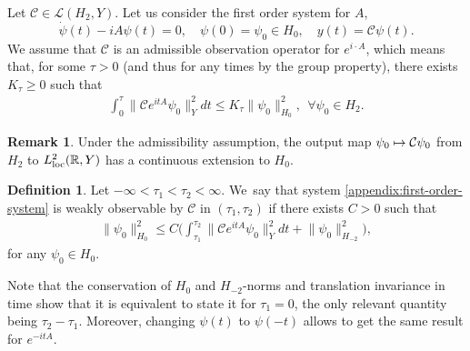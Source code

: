 \documentclass[10pt]{amsart}
\newcommand\mto{\mathchoice{\longmapsto}{\mapsto}{\mapsto}{\mapsto}}
\theoremstyle{definition}
\newtheorem{definition}[theorem]{Definition}
\newtheorem{remark}[theorem]{Remark}
\let\mc\mathcal
\newcommand{\R}{\mathbb{R}}
\providecommand{\norm}[1]{\lVert#1\rVert}
\begin{document}
Let $\mc{C}\in \mc{L}(H_2, Y)$. Let us consider the first order system for $A$,
\begin{equation}
\label{appendix:first-order-system}
\dot{\psi}(t)-iA\psi(t)=0,\quad \psi(0)=\psi_0\in H_0,\quad y(t)=\mc{C}\psi(t).
\end{equation}
We assume that $\mc{C}$ is an admissible observation operator for $e^{i\cdot A}$, which means that, for some $\tau>0$ (and thus for any times by the group property), there exists $K_\tau\geq 0$ such that
\begin{align*}
\int_0^\tau \norm{\mc{C}e^{itA}\psi_0}_Y^2dt\leq K_\tau \norm{\psi_0}_{H_0}^2,\ \ \forall \psi_0\in H_2.
\end{align*}
\begin{remark}
Under the admissibility assumption, the output map $\psi_0\mto \mc{C}\psi_0$ from $H_2$ to $L_{\textup{loc}}^2(\R, Y)$ has a continuous extension to $H_0$.
\end{remark}
\begin{definition}
Let $-\infty< \tau_1<\tau_2<\infty$. We~say that system \eqref{appendix:first-order-system} is weakly observable by $\mc{C}$ in $(\tau_1, \tau_2)$ if there exists $C>0$ such that
\begin{align*}
\norm{\psi_0}_{H_0}^2\leq C\biggl(\int_{\tau_1}^{\tau_2} \norm{\mc{C}e^{itA}\psi_0}_{Y}^2dt+\norm{\psi_0}_{H_{-2}}^2\biggr),
\end{align*}
for any $\psi_0\in H_0$.
\end{definition}

Note that the conservation of $H_0$ and $H_{-2}$-norms and translation invariance in time show that it is equivalent to state it for $\tau_1=0$, the only relevant quantity being $\tau_2-\tau_1$. Moreover, changing $\psi(t)$ to $\psi(-t)$ allows to get the same result for $e^{-itA}$.
\end{document}
